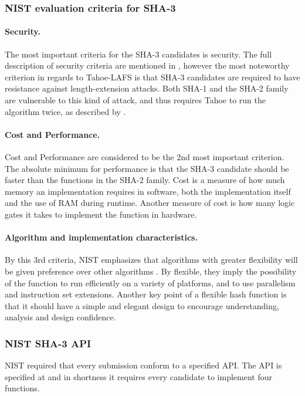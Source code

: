 \documentclass[english,12pt,a4paper]{book}
\begin{document}
\subsubsection{\ac{NIST} evaluation criteria for \ac{SHA}-3}

\label{sec:lengthextension}
\paragraph{Security.} The most important criteria for the SHA-3
candidates\cite{s_nistround2} is security. The full description of security
criteria are mentioned in \cite{s_fedreg}, however the most noteworthy criterion
in regards to Tahoe-\ac{LAFS} is that \ac{SHA}-3 candidates are required to have
resistance against length-extension attacks. Both \ac{SHA}-1 and the \ac{SHA}-2
family are vulnerable to this kind of attack, and thus requires
Tahoe to run the algorithm twice, as described by \citet{schneier}.

\paragraph{Cost and Performance.} Cost and Performance are considered to be the
2nd most important criterion. The absolute minimum for performance is that the
SHA-3 candidate should be faster than the functions in the \ac{SHA}-2 family.
Cost is a measure of how much memory an implementation requires in software,
both the implementation itself and the use of \ac{RAM} during runtime. Another
measure of cost is how many logic gates it takes to implement the function in
hardware.

\paragraph{Algorithm and implementation characteristics.} By this 3rd criteria,
\ac{NIST} emphasizes that algorithms with greater flexibility will be given
preference over other algorithms \cite{s_nistround2}. By flexible, they imply
the possibility of the function to run efficiently on a variety of platforms,
and to use parallelism and instruction set extensions. Another key point of a
flexible hash function is that it should have a simple and elegant design to
encourage understanding, analysis and design confidence.

\subsubsection{\ac{NIST} \ac{SHA}-3 \ac{API}}
\ac{NIST} required that every submission conform to a specified
\ac{API}\cite{s_fedreg}. The \ac{API} is specified at \cite{s_nistapi} and in
shortness it requires every candidate to implement four functions.
\end{document}
